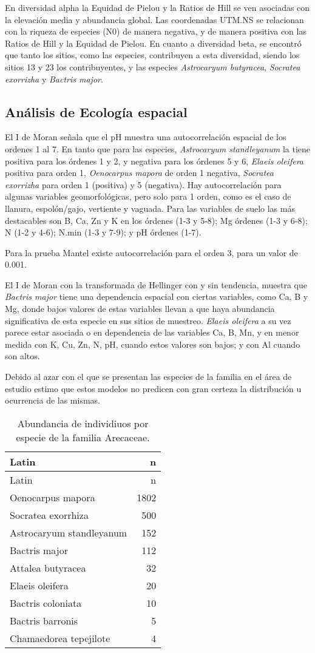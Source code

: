 \documentclass[11pt,]{article}
\begin{document}
En diversidad alpha la Equidad de Pielou y la Ratios de Hill se ven
asociadas con la elevación media y abundancia global. Las coordenadas
UTM.NS se relacionan con la riqueza de especies (N0) de manera negativa,
y de manera positiva con las Ratios de Hill y la Equidad de Pielou. En
cuanto a diversidad beta, se encontró que tanto los sitios, como las
especies, contribuyen a esta diversidad, siendo los sitios 13 y 23 los
contribuyentes, y las especies \emph{Astrocaryum butyracea},
\emph{Socratea exorrizha} y \emph{Bactris major}.

\subsection{Análisis de Ecología
espacial}\label{anuxe1lisis-de-ecologuxeda-espacial}

El I de Moran señala que el pH muestra una autocorrelación espacial de
los ordenes 1 al 7. En tanto que para las especies, \emph{Astrocaryum
standleyanum} la tiene positiva para los órdenes 1 y 2, y negativa para
los órdenes 5 y 6, \emph{Elaeis oleifera} positiva para orden 1,
\emph{Oenocarpus mapora} de orden 1 negativa, \emph{Socratea exorrizha}
para orden 1 (positiva) y 5 (negativa). Hay autocorrelación para algunas
variables geomorfológicas, pero solo para 1 orden, como es el caso de
llanura, espolón/gajo, vertiente y vaguada. Para las variables de suelo
las más destacables son B, Ca, Zn y K en los órdenes (1-3 y 5-8); Mg
órdenes (1-3 y 6-8); N (1-2 y 4-6); N.min (1-3 y 7-9); y pH órdenes
(1-7).

Para la prueba Mantel existe autocorrelación para el orden 3, para un
valor de 0.001.

El I de Moran con la transformada de Hellinger con y sin tendencia,
muestra que \emph{Bactris major} tiene una dependencia espacial con
ciertas variables, como Ca, B y Mg, donde bajos valores de estas
variables llevan a que haya abundancia significativa de esta especie en
sus sitios de muestreo. \emph{Elaeis oleifera} a su vez parece estar
asociada o en dependencia de las variables Ca, B, Mn, y en menor medida
con K, Cu, Zn, N, pH, cuando estos valores son bajos; y con Al cuando
son altos.

Debido al azar con el que se presentan las especies de la familia en el
área de estudio estimo que estos modelos no predicen con gran certeza la
distribución u ocurrencia de las mismas.

\begin{longtable}[]{@{}lr@{}}
\caption{\label{tab:abun_sp}Abundancia de individiuos por especie de la
familia Arecaceae.}\tabularnewline
\toprule
Latin & n\tabularnewline
\midrule
\endfirsthead
\toprule
Latin & n\tabularnewline
\midrule
\endhead
Oenocarpus mapora & 1802\tabularnewline
Socratea exorrhiza & 500\tabularnewline
Astrocaryum standleyanum & 152\tabularnewline
Bactris major & 112\tabularnewline
Attalea butyracea & 32\tabularnewline
Elaeis oleifera & 20\tabularnewline
Bactris coloniata & 10\tabularnewline
Bactris barronis & 5\tabularnewline
Chamaedorea tepejilote & 4\tabularnewline
\bottomrule
\end{longtable}
\end{document}
